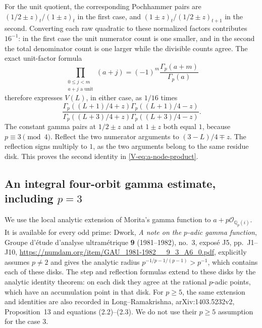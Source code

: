 \documentclass[11pt,letterpaper]{article}
\numberwithin{equation}{section}
\begin{document}
For the unit quotient, the corresponding Pochhammer pairs are
$(1/2\pm z)_t/(1\pm z)_t$ in the first case, and
$(1\pm z)_t/(1/2\pm z)_{t+1}$ in the second. Converting each raw
quadratic to these normalized factors contributes $16^{-1}$:
in the first case the unit numerator count is one smaller, and
in the second the total denominator count is one larger while
the divisible counts agree. The exact unit-factor formula
\[
 \prod_{\substack{0\le j<m\\a+j\text{ a unit}}}(a+j)
 =(-1)^m\frac{\Gamma_p(a+m)}{\Gamma_p(a)}
\]
therefore expresses $V(L)$, in either case, as $1/16$ times
\[
 \frac{\Gamma_p((L+1)/4+z)\Gamma_p((L+1)/4-z)}
 {\Gamma_p((L+3)/4+z)\Gamma_p((L+3)/4-z)}.
\]
The constant gamma pairs at $1/2\pm z$ and at $1\pm z$ both equal
$1$, because $p\equiv3\pmod4$. Reflect the two numerator arguments
to $(3-L)/4\mp z$. The reflection signs multiply to $1$, as the
two arguments belong to the same residue disk. This proves the
second identity in \eqref{V-eq:a-node-product}.
\subsection{An integral four-orbit gamma estimate, including $p=3$}
We use the local analytic extension of Morita's gamma function to
$a+p\mathcal O_{\mathbb Q_p(i)}$. It is available for every odd prime:
Dwork, \emph{A note on the $p$-adic gamma function}, Groupe d'\'etude
d'analyse ultram\'etrique \textbf{9} (1981--1982), no.~3, expos\'e J5, pp.~J1--J10,
\url{https://numdam.org/item/GAU_1981-1982__9_3_A6_0.pdf},
explicitly assumes $p\ne2$ and gives the analytic radius
$p^{-1/p-1/(p-1)}>p^{-1}$, which contains each of these disks.
The step and reflection formulas extend to these disks by the
analytic identity theorem: on each disk they agree at the rational
$p$-adic points, which have an accumulation point in that disk.
For $p\ge5$, the same extension and identities are also recorded
in Long--Ramakrishna, arXiv:1403.5232v2, Proposition~13 and equations
(2.2)--(2.3). We do not use their $p\ge5$ assumption for the case $3$.
\end{document}
